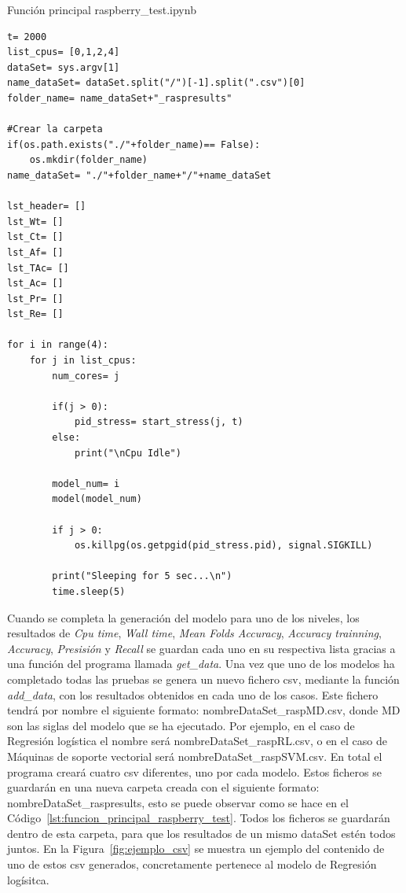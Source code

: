 \documentclass[a4paper, 12pt]{book}
\begin{document}
\begin{listing}[]
    \caption{Función principal raspberry\_test.ipynb}{}
    \label{lst:funcion_principal_raspberry_test}
    \begin{verbatim}
t= 2000
list_cpus= [0,1,2,4]
dataSet= sys.argv[1]
name_dataSet= dataSet.split("/")[-1].split(".csv")[0]
folder_name= name_dataSet+"_raspresults"

#Crear la carpeta
if(os.path.exists("./"+folder_name)== False):
    os.mkdir(folder_name)
name_dataSet= "./"+folder_name+"/"+name_dataSet

lst_header= []
lst_Wt= []
lst_Ct= []
lst_Af= []
lst_TAc= []
lst_Ac= []
lst_Pr= []
lst_Re= []

for i in range(4):
    for j in list_cpus:
        num_cores= j
        
        if(j > 0):
            pid_stress= start_stress(j, t)
        else:
            print("\nCpu Idle")
            
        model_num= i    
        model(model_num)
        
        if j > 0:
            os.killpg(os.getpgid(pid_stress.pid), signal.SIGKILL)
        
        print("Sleeping for 5 sec...\n")
        time.sleep(5)
    \end{verbatim}
\end{listing}

Cuando se completa la generación del modelo para uno de los niveles, los resultados de \textit{Cpu time}, \textit{Wall time}, \textit{Mean Folds Accuracy}, \textit{Accuracy trainning}, \textit{Accuracy}, \textit{Presisión} y \textit{Recall} se guardan cada uno en su respectiva lista gracias a una función del programa llamada \textit{get\_data}. Una vez que uno de los modelos ha completado todas las pruebas se genera un nuevo fichero csv, mediante la función \textit{add\_data}, con los resultados obtenidos en cada uno de los casos.
Este fichero tendrá por nombre el siguiente formato: nombreDataSet\_raspMD.csv, donde MD son las siglas del modelo que se ha ejecutado. Por ejemplo, en el caso de Regresión logística el nombre será nombreDataSet\_raspRL.csv, o en el caso de Máquinas de soporte vectorial será nombreDataSet\_raspSVM.csv. En total el programa creará cuatro csv diferentes, uno por cada modelo. Estos ficheros se guardarán en una nueva carpeta creada con el siguiente formato: nombreDataSet\_raspresults, esto se puede observar como se hace en el Código~\ref{lst:funcion_principal_raspberry_test}. Todos los ficheros se guardarán dentro de esta carpeta, para que los resultados de un mismo dataSet estén todos juntos. En la Figura~\ref{fig:ejemplo_csv} se muestra un ejemplo del contenido de uno de estos csv generados, concretamente pertenece al modelo de Regresión logísitca.
\end{document}
